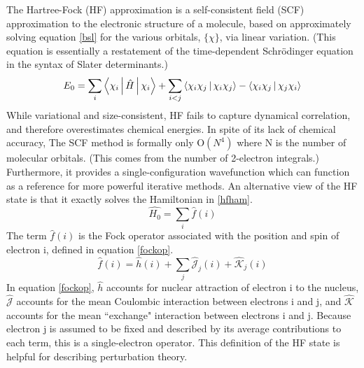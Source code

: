 \documentclass{article}
\begin{document}
\begin{paragraph}{}
The Hartree-Fock (HF) approximation is a self-consistent field (SCF) approximation to the electronic structure of a molecule, based on approximately solving equation \ref{bsl} for the various orbitals, $\{\chi\}$, via linear variation. \cite{szabo} (This equation is essentially a restatement of the time-dependent Schr{\"o}dinger equation in the syntax of Slater determinants.)
\begin{equation} \label{bsl}
E_0 =\sum_{i}\Braket{\chi_i|\hat{H}|\chi_i}+\sum_{i<j}\Braket{\chi_i\chi_j|\chi_i\chi_j}-\Braket{\chi_i\chi_j|\chi_j\chi_i}
\end{equation}
While variational and size-consistent, HF fails to capture dynamical correlation, and therefore overestimates chemical energies. \cite{szabo}\cite{jensen} In spite of its lack of chemical accuracy, The SCF method is formally only O$\left(N^4\right)$ where N is the number of molecular orbitals. (This comes from the number of 2-electron integrals.) \cite{szabo}\cite{jensen} Furthermore, it provides a single-configuration wavefunction which can function as a reference for more powerful iterative methods. \cite{szabo}  An alternative view of the HF state is that it exactly solves the Hamiltonian in \ref{hfham}.
\begin{equation} \label{hfham}
\hat{H_0}=\sum_i\hat{f}\left(i\right)
\end{equation}
The term $\hat{f}\left(i\right)$ is the Fock operator associated with the position and spin of electron i, defined in equation \ref{fockop}. \cite{szabo}
\begin{equation} \label{fockop}
\hat{f}\left(i\right)=\hat{h}\left(i\right)+\sum_{j}\hat{\mathcal{J}}_j\left(i\right)+\hat{\mathcal{K}}_j\left(i\right)
\end{equation}
In equation \ref{fockop}, $\hat{h}$ accounts for nuclear attraction of electron i to the nucleus, $\hat{\mathcal{J}}$ accounts for the mean Coulombic interaction between electrons i and j, and $\hat{\mathcal{K}}$ accounts for the mean ``exchange" interaction between electrons i and j. \cite{szabo} Because electron j is assumed to be fixed and described by its average contributions to each term, this is a single-electron operator. \cite{szabo}  This definition of the HF state is helpful for describing perturbation theory. \cite{szabo} 
\end{paragraph}
\end{document}

